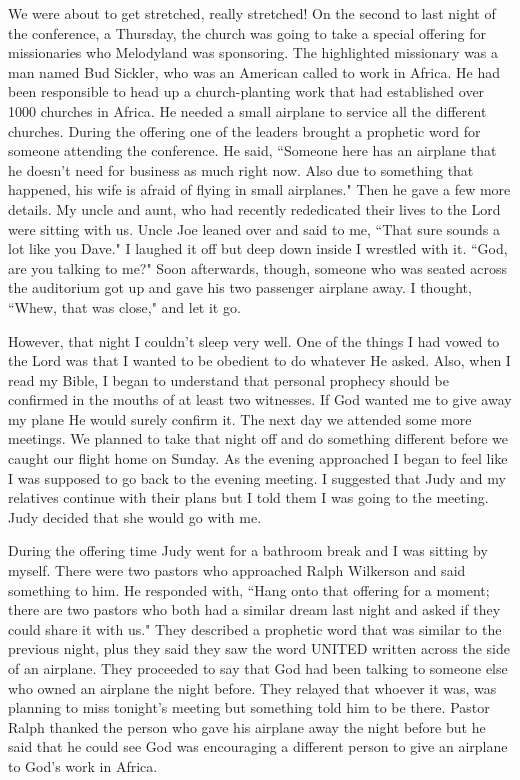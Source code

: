 \documentclass[oneside]{book}
\begin{document}
We were about to get stretched, really stretched! On the second to last night of the conference, a Thursday, the church was going to take a special offering for missionaries who Melodyland was sponsoring. The highlighted missionary was a man named Bud Sickler, who was an American called to work in Africa. He had been responsible to head up a church-planting work that had established over 1000 churches in Africa. He needed a small airplane to service all the different churches. During the offering one of the leaders brought a prophetic word for someone attending the conference. He said, ``Someone here has an airplane that he doesn't need for business as much right now. Also due to something that happened, his wife is afraid of flying in small airplanes." Then he gave a few more details. My uncle and aunt, who had recently rededicated their lives to the Lord were sitting with us. Uncle Joe leaned over and said to me, ``That sure sounds a lot like you Dave." I laughed it off but deep down inside I wrestled with it. ``God, are you talking to me?" Soon afterwards, though, someone who was seated across the auditorium got up and gave his two passenger airplane away. I thought, ``Whew, that was close," and let it go.

However, that night I couldn't sleep very well. One of the things I had vowed to the Lord was that I wanted to be obedient to do whatever He asked. Also, when I read my Bible, I began to understand that personal prophecy should be confirmed in the mouths of at least two witnesses. If God wanted me to give away my plane He would surely confirm it. The next day we attended some more meetings. We planned to take that night off and do something different before we caught our flight home on Sunday. As the evening approached I began to feel like I was supposed to go back to the evening meeting. I suggested that Judy and my relatives continue with their plans but I told them I was going to the meeting. Judy decided that she would go with me. 

During the offering time Judy went for a bathroom break and I was sitting by myself. There were two pastors who approached Ralph Wilkerson and said something to him. He responded with, ``Hang onto that offering for a moment; there are two pastors who both had a similar dream last night and asked if they could share it with us." They described a prophetic word that was similar to the previous night, plus they said they saw the word UNITED written across the side of an airplane. They proceeded to say that God had been talking to someone else who owned an airplane the night before. They relayed that whoever it was, was planning to miss tonight's meeting but something told him to be there. Pastor Ralph thanked the person who gave his airplane away the night before but he said that he could see God was encouraging a different person to give an airplane to God's work in Africa. 
\end{document}
